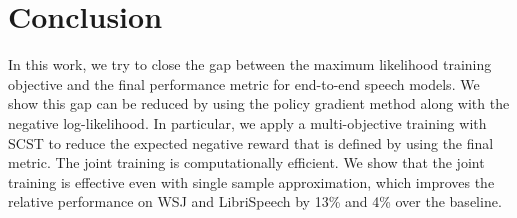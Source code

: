 \documentclass{article}
\begin{document}
\section{Conclusion}
In this work, we try to close the gap between the maximum likelihood training objective and the final performance metric for end-to-end speech models. We show this gap can be reduced by using the policy gradient method along with the negative log-likelihood. In particular, we apply a multi-objective training with SCST to reduce the expected negative reward that is defined by using the final metric. The joint training is computationally efficient. We show that the joint training is effective even with single sample approximation, which improves the relative performance on WSJ and LibriSpeech by 13\% and 4\% over the baseline. 



\end{document}
